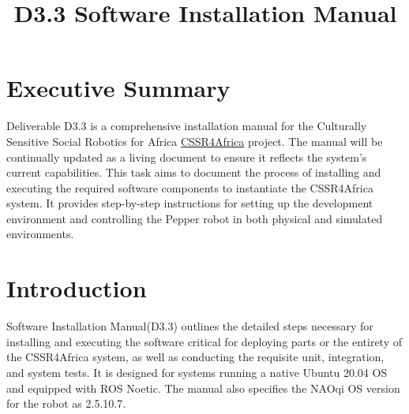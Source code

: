 \documentclass{CSSRforAfrica}
\newcommand{\blank}{~\\}
\begin{document}



\title{D3.3 Software Installation Manual}    

\partner{}                                      



\maketitle

\section*{Executive Summary}
Deliverable D3.3 is a comprehensive installation manual for the Culturally Sensitive Social Robotics for Africa \href{https://cssr4africa.github.io/}{CSSR4Africa} project. The manual will be continually updated as a living document to ensure it reflects the system's current capabilities. This task aims to document the process of installing and executing the required software components to instantiate the CSSR4Africa system. It provides step-by-step instructions for setting up the development environment and controlling the Pepper robot in both physical and simulated environments.
\label{executive_summary}

\pagebreak
\tableofcontents
\pagebreak


\pagebreak


\section{Introduction}
Software Installation Manual(D3.3) outlines the detailed steps necessary for installing and executing the software critical for deploying parts or the entirety of the CSSR4Africa system, as well as conducting the requisite unit, integration, and system tests. It is designed for systems running a native Ubuntu 20.04 OS and equipped with ROS Noetic. The manual also specifies the NAOqi OS version for the robot as 2.5.10.7.
\end{document}
